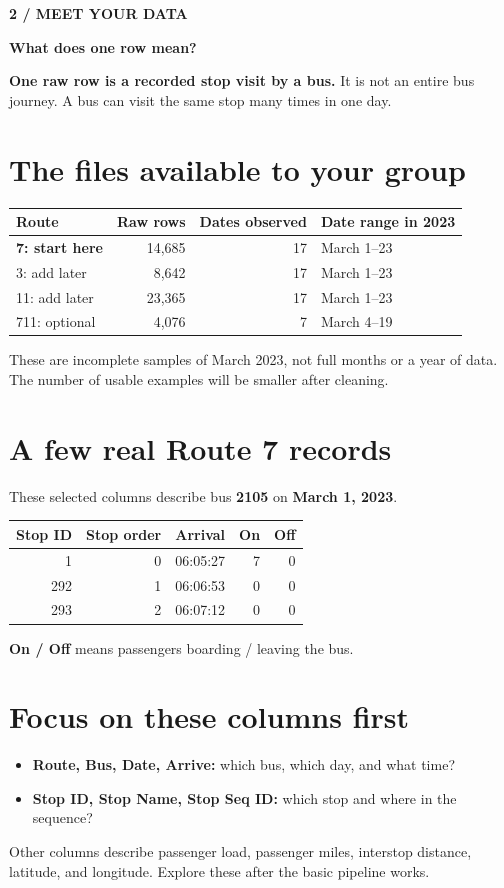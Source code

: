 \documentclass[11pt,letterpaper]{article}
\newcommand{\heading}[2]{{\small\color{accent}\textbf{#1}}\par{\LARGE\bfseries #2}\par\vspace{4pt}}
\begin{document}
\newpage
\heading{2 / MEET YOUR DATA}{What does one row mean?}
\textbf{One raw row is a recorded stop visit by a bus.} It is not an entire
bus journey. A bus can visit the same stop many times in one day.

\section*{The files available to your group}
\begin{center}\small
\begin{tabular}{@{}lrrl@{}}
\toprule
Route & Raw rows & Dates observed & Date range in 2023\\
\midrule
\textbf{7: start here} & 14,685 & 17 & March 1--23\\
3: add later & 8,642 & 17 & March 1--23\\
11: add later & 23,365 & 17 & March 1--23\\
711: optional & 4,076 & 7 & March 4--19\\
\bottomrule
\end{tabular}
\end{center}
These are incomplete samples of March 2023, not full months or a year of data.
The number of usable examples will be smaller after cleaning.

\section*{A few real Route 7 records}
These selected columns describe bus \textbf{2105} on \textbf{March 1, 2023}.
\begin{center}
\begin{tabular}{@{}rrlrr@{}}
\toprule
Stop ID & Stop order & Arrival & On & Off\\
\midrule
1 & 0 & 06:05:27 & 7 & 0\\
292 & 1 & 06:06:53 & 0 & 0\\
293 & 2 & 06:07:12 & 0 & 0\\
\bottomrule
\end{tabular}
\end{center}
\textbf{On / Off} means passengers boarding / leaving the bus.

\section*{Focus on these columns first}
\begin{itemize}
\item \textbf{Route, Bus, Date, Arrive:} which bus, which day, and what time?
\item \textbf{Stop ID, Stop Name, Stop Seq ID:} which stop and where in the sequence?
\end{itemize}
Other columns describe passenger load, passenger miles, interstop distance,
latitude, and longitude. Explore these after the basic pipeline works.
\end{document}
